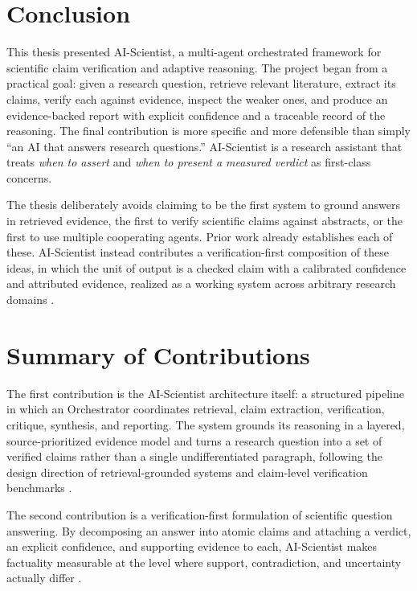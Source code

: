 \section{Conclusion }

This thesis presented AI-Scientist, a multi-agent orchestrated framework for scientific claim verification and
adaptive reasoning. The project began from a practical goal: given a research question, retrieve relevant
literature, extract its claims, verify each against evidence, inspect the weaker ones, and produce an
evidence-backed report with explicit confidence and a traceable record of the reasoning. The final contribution is
more specific and more defensible than simply ``an AI that answers research questions.'' AI-Scientist is a research
assistant that treats \emph{when to assert} and \emph{when to present a measured verdict} as first-class concerns.

The thesis deliberately avoids claiming to be the first system to ground answers in retrieved evidence, the first to
verify scientific claims against abstracts, or the first to use multiple cooperating agents. Prior work already
establishes each of these. AI-Scientist instead contributes a verification-first composition of these ideas, in
which the unit of output is a checked claim with a calibrated confidence and attributed evidence, realized as a
working system across arbitrary research domains \cite{lewis2020rag,thorne2018fever,wadden2020scifact,wu2023autogen}.

\section{Summary of Contributions }

The first contribution is the AI-Scientist architecture itself: a structured pipeline in which an Orchestrator
coordinates retrieval, claim extraction, verification, critique, synthesis, and reporting. The system grounds its
reasoning in a layered, source-prioritized evidence model and turns a research question into a set of verified
claims rather than a single undifferentiated paragraph, following the design direction of retrieval-grounded
systems and claim-level verification benchmarks \cite{guu2020realm,petroni2020kilt,thakur2021beir}.

The second contribution is a verification-first formulation of scientific question answering. By decomposing an
answer into atomic claims and attaching a verdict, an explicit confidence, and supporting evidence to each,
AI-Scientist makes factuality measurable at the level where support, contradiction, and uncertainty actually
differ \cite{honovich2022true,min2023factscore,es2023ragas}.

